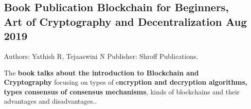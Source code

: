 \subsection{{Book Publication Blockchain for Beginners, Art of Cryptography and Decentralization \hfill Aug 2019}}
\begin{zitemize}
\item Authors: Yathish R, Tejaaswini N Publisher: Shroff Publications.
\item The \textbf{book talks about the introduction to Blockchain and Cryptography} focusing on types of
e\textbf{ncryption and decryption algorithms, types consensus of consensus mechanisms}, kinds of
blockchains and their advantages and disadvantages..
\end{zitemize}
